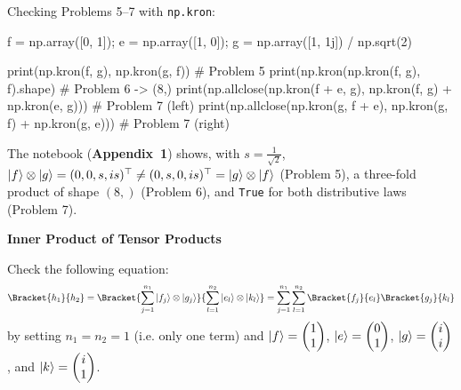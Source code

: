 \documentclass[a4paper, 10pt]{article}
\begin{document}
\begin{solution}
	\noindent Checking Problems 5--7 with \texttt{np.kron}:
	\begin{codingbox}
f = np.array([0, 1]); e = np.array([1, 0]); g = np.array([1, 1j]) / np.sqrt(2)

print(np.kron(f, g), np.kron(g, f))                                    # Problem 5
print(np.kron(np.kron(f, g), f).shape)                                 # Problem 6 -> (8,)
print(np.allclose(np.kron(f + e, g), np.kron(f, g) + np.kron(e, g)))   # Problem 7 (left)
print(np.allclose(np.kron(g, f + e), np.kron(g, f) + np.kron(g, e)))   # Problem 7 (right)
\end{codingbox}
	\noindent The notebook (\textbf{Appendix~1}) shows, with \( s = \tfrac{1}{\sqrt{2}} \),
	\( \ket{f}\otimes\ket{g} = (0, 0, s, is)^{\top} \neq (0, s, 0, is)^{\top} = \ket{g}\otimes\ket{f} \) (Problem 5),
	a three-fold product of shape \( (8,) \) (Problem 6),
	and \texttt{True} for both distributive laws (Problem 7).
\end{solution}

\begin{problem}
\textbf{Inner Product of Tensor Products}
\par Check the following equation:
\[
	\Bracket{h_1}{h_2}
	= \Bracket{\sum_{j = 1}^{n_1} \ket{f_j} \otimes \ket{g_j}}{\sum_{l = 1}^{n_2} \ket{e_l} \otimes \ket{k_l}}
	= \sum_{j = 1}^{n_1} \sum_{l = 1}^{n_2} \Bracket{f_j}{e_l} \Bracket{g_j}{k_l}
\]
by setting \( n_1 = n_2 = 1 \) (i.e. only one term) and \( \displaystyle \ket{f} = \begin{pmatrix}
	1 \\ 1
\end{pmatrix} \), \( \displaystyle \ket{e} = \begin{pmatrix}
	0 \\ 1
\end{pmatrix} \), \( \displaystyle \ket{g} = \begin{pmatrix}
	i \\ i
\end{pmatrix} \), and \( \displaystyle \ket{k} = \begin{pmatrix}
	i \\ 1
\end{pmatrix} \).
\end{problem}
\end{document}
